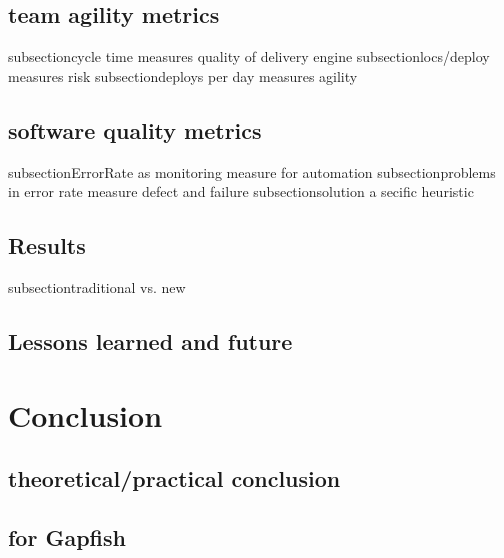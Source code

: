 \section{team agility metrics}
subsection{cycle time measures quality of delivery engine}
subsection{locs/deploy measures risk}
subsection{deploys per day measures agility}
\section{software quality metrics}
subsection{ErrorRate as monitoring measure for automation}
subsection{problems in error rate measure defect and failure}
subsection{solution a secific heuristic}
\section{Results}
subsection{traditional vs. new}
\section{Lessons learned and future}

\chapter{Conclusion}
\section{theoretical/practical conclusion}
\section{for Gapfish}
